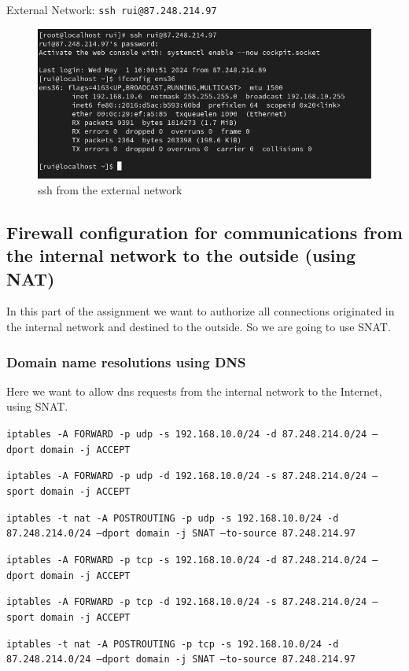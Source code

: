 \documentclass{article}
\begin{document}
\texttt{}\par
\texttt{}\par
External Network: \texttt{ssh rui@87.248.214.97} \par
\texttt{}\par
\begin{figure}[H]
    \centering
    \includegraphics[scale=0.5]{out/out_ssh_from_dns_servers.png}
    \caption{ssh from the external network}
    \label{fig:network-arc}
\end{figure}


\subsection{Firewall configuration for communications from the internal network to the outside (using NAT)}
\quad In this part of the assignment we want to authorize all connections originated in the internal network and destined to the outside. So we are going to use SNAT.
\subsubsection{Domain name resolutions using DNS}
\quad Here we want to allow dns requests from the internal network to the Internet, using SNAT.


\texttt{}\par
\texttt{iptables -A FORWARD -p udp -s 192.168.10.0/24 -d 87.248.214.0/24 --dport domain -j ACCEPT}\par
\texttt{iptables -A FORWARD -p udp -d 192.168.10.0/24 -s 87.248.214.0/24 --sport domain -j ACCEPT}\par
\texttt{iptables -t nat -A POSTROUTING -p udp -s 192.168.10.0/24 -d 87.248.214.0/24 --dport domain -j SNAT --to-source 87.248.214.97}\par
\texttt{iptables -A FORWARD -p tcp -s 192.168.10.0/24 -d 87.248.214.0/24 --dport domain -j ACCEPT}\par
\texttt{iptables -A FORWARD -p tcp -d 192.168.10.0/24 -s 87.248.214.0/24 --sport domain -j ACCEPT}\par
\texttt{iptables -t nat -A POSTROUTING -p tcp -s 192.168.10.0/24 -d 87.248.214.0/24 --dport domain -j SNAT --to-source 87.248.214.97}\par
\texttt{}\par
\end{document}
